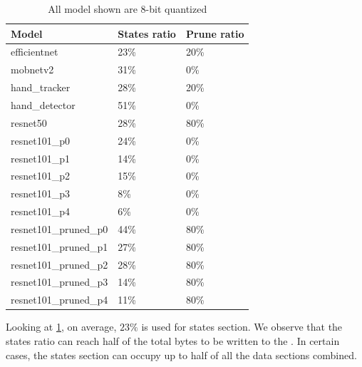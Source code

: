 \begin{table}[hbtp]
\centering
\begin{tabular}{@{}lll@{}}
\toprule
\textbf{Model}          & \textbf{States ratio} & \textbf{Prune ratio} \\ \midrule
efficientnet            & 23\%                  & 20\%                 \\
mobnetv2                & 31\%                  & 0\%                  \\
hand\_tracker           & 28\%                  & 20\%                 \\
hand\_detector          & 51\%                  & 0\%                  \\
resnet50                & 28\%                  & 80\%                 \\
resnet101\_p0           & 24\%                  & 0\%                  \\
resnet101\_p1           & 14\%                  & 0\%                  \\
resnet101\_p2           & 15\%                  & 0\%                  \\
resnet101\_p3           & 8\%                   & 0\%                  \\
resnet101\_p4           & 6\%                   & 0\%                  \\
resnet101\_pruned\_p0   & 44\%                  & 80\%                 \\
resnet101\_pruned\_p1   & 27\%                  & 80\%                 \\
resnet101\_pruned\_p2   & 28\%                  & 80\%                 \\
resnet101\_pruned\_p3   & 14\%                  & 80\%                 \\
resnet101\_pruned\_p4   & 11\%                  & 80\%                 \\ \bottomrule
\end{tabular}
\caption{All model shown are 8-bit quantized}
\label{tab:states_ratio}
\end{table}

Looking at \cref{tab:states_ratio}, on average, $23\%$ is used for states section.
We observe that the states ratio can reach half of the total bytes to be written to the \graicore{}.
In certain cases, the states section can occupy up to half of all the data sections combined.

